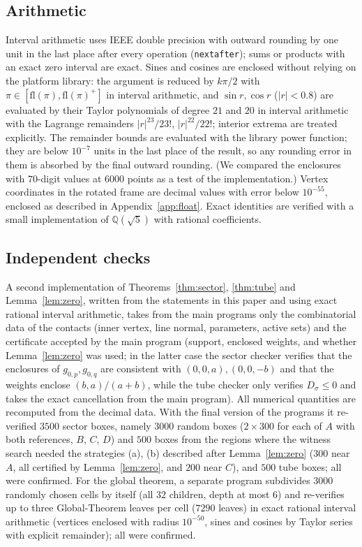 \documentclass[11pt]{amsart}
\theoremstyle{definition}
\newcommand{\Q}{\mathbb{Q}}
\newcommand{\sq}{\sqrt5}
\newcommand{\abs}[1]{\lvert #1\rvert}
\begin{document}
\subsection{Arithmetic}\label{sec:ia}
Interval arithmetic uses IEEE double precision with outward rounding by one unit in the last place after every
operation (\texttt{nextafter}); sums or products with an exact zero interval are exact. Sines and cosines are enclosed
without relying on the platform library: the argument is reduced by $k\pi/2$ with $\pi\in[\mathrm{fl}(\pi),\mathrm{fl}(\pi)^+]$ in
interval arithmetic, and $\sin r,\cos r$ ($\abs r<0.8$) are evaluated by their Taylor polynomials of degree $21$ and $20$
in interval arithmetic with the Lagrange remainders $\abs r^{23}/23!$, $\abs r^{22}/22!$; interior extrema are treated
explicitly. The remainder bounds are evaluated with the library power function; they are below $10^{-7}$ units in the
last place of the result, so any rounding error in them is absorbed by the final outward rounding. (We compared the
enclosures with $70$-digit values at $6000$ points as a test of the implementation.) Vertex coordinates in the rotated
frame are decimal values with error below $10^{-55}$, enclosed as described in Appendix~\ref{app:float}.
Exact identities are verified with a small implementation of $\Q(\sq)$ with rational coefficients.

\subsection{Independent checks}\label{sec:indep}
A second implementation of Theorems~\ref{thm:sector}, \ref{thm:tube} and Lemma~\ref{lem:zero}, written from the
statements in this paper and using exact rational interval arithmetic, takes from the main programs only the
combinatorial data of the contacts (inner vertex, line normal, parameters, active sets) and the certificate accepted by
the main program (support, enclosed weights, and whether Lemma~\ref{lem:zero} was used; in the latter case the sector
checker verifies that the enclosures of $g_{0,p},g_{0,q}$ are consistent with $(0,0,a),(0,0,-b)$ and that the weights
enclose $(b,a)/(a+b)$, while the tube checker only verifies $D_\sigma\le0$ and takes the exact cancellation from the
main program). All numerical quantities are recomputed from the decimal data. With the final version of the programs
it re-verified $3500$ sector boxes, namely $3000$ random boxes ($2\times300$ for each of $A$ with both references, $B$,
$C$, $D$) and $500$ boxes from the regions where the witness search needed the strategies (a), (b) described after
Lemma~\ref{lem:zero} ($300$ near $A$, all certified by Lemma~\ref{lem:zero}, and $200$ near $C$), and $500$ tube boxes;
all were confirmed. For the global theorem, a separate program subdivides $3000$ randomly chosen cells by itself (all
$32$ children, depth at most $6$) and re-verifies up to three Global-Theorem leaves per cell ($7290$ leaves) in exact rational interval arithmetic (vertices enclosed with radius $10^{-50}$, sines and cosines
by Taylor series with explicit remainder); all were confirmed.
\end{document}
